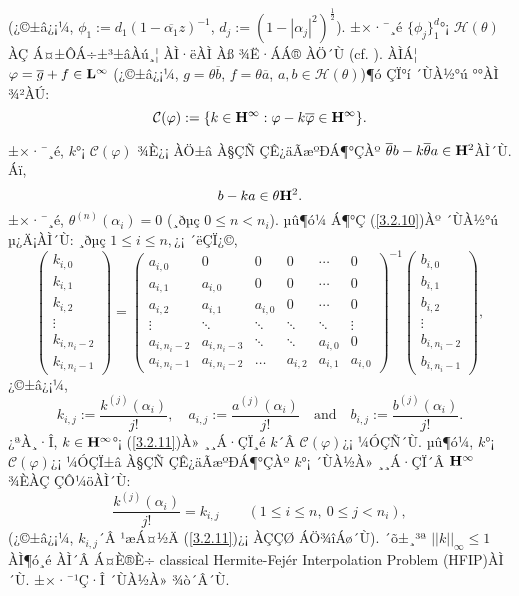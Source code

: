 \documentclass[12pt,a4paper,2sided]{article}
\begin{document}
\noindent (¿©±â¿¡¼­, $\phi_1 :=d_1(1- \overline{\alpha_1}z)^{-1}$,
$d_j:=(1-|\alpha_j |^2)^{\frac{1}{2}}$). ±×·¯¸é $\{\phi_j \}_1^d$°¡
$\mathcal H (\theta)$ÀÇ Á¤±ÔÁ÷±³±âÀú¸¦ ÀÌ·ëÀÌ Àß ¾Ë·ÁÁ® ÀÖ´Ù (cf.
\cite[Theorem X.1.5]{FF}). ÀÌÁ¦ $\varphi=\overline g+f\in \bold
L^\infty$ (¿©±â¿¡¼­, $g=\theta \overline b$, $f=\theta \overline a$,
$a, b\in \mathcal H (\theta)$)¶ó ÇÏ°í ´ÙÀ½°ú °°ÀÌ ¾²ÀÚ:
$$
\mathcal{C}(\varphi):= \{k \in \bold H^{\infty} : \varphi -k
\overline{\varphi} \in \bold H^{\infty}\}.
$$
\newpage{}

\vspace{.8 cm} \noindent ±×·¯¸é, $k$°¡ $\mathcal{C}(\varphi)$ ¾È¿¡
ÀÖ±â À§ÇÑ ÇÊ¿äÃæºÐÁ¶°ÇÀº $\overline {\theta} b-k \overline{\theta}a
\in \bold H^2$ÀÌ´Ù. Áï,
\begin{equation}\label{3.2.10}
b-ka \in \theta \bold H^2 .
\end{equation}
±×·¯¸é, $\theta^{(n)} (\alpha_i) =0$ (¸ðµç $0 \leq n  < n_i$).
µû¶ó¼­ Á¶°Ç (\ref{3.2.10})Àº ´ÙÀ½°ú µ¿Ä¡ÀÌ´Ù:
¸ðµç $1 \leq i \leq n,$¿¡ ´ëÇÏ¿©,
\begin{equation}\label{3.2.11}
\begin{pmatrix} k_{i,0}\\
k_{i,1}\\
k_{i,2}\\
\vdots\\
k_{i,n_i -2}\\
k_{i,n_i -1}
\end{pmatrix}
=\begin{pmatrix} a_{i,0}&0&0&0&\cdots&0\\
a_{i,1}&a_{i,0}&0&0&\cdots&0\\
a_{i,2}&a_{i,1}&a_{i,0}&0&\cdots&0\\
\vdots&\ddots&\ddots&\ddots&\ddots&\vdots \\
a_{i,n_i -2}&a_{i,n_i -3}&\ddots&\ddots&a_{i,0}&0\\
a_{i,n_i -1}&a_{i,n_i -2}&\hdots&a_{i,2}&a_{i,1}&a_{i,0}
\end{pmatrix}^{-1}
\begin{pmatrix} b_{i,0}\\
b_{i,1}\\
b_{i,2}\\
\vdots\\
b_{i,n_i -2}\\
b_{i,n_i -1}
\end{pmatrix},
\end{equation}
¿©±â¿¡¼­,
$$
k_{i,j}:= \frac{k^{(j)}(\alpha_i)}{j!},\quad a_{i,j}:=
\frac{a^{(j)}(\alpha_i)}{j!} \quad\text{and}\quad
b_{i,j}:=\frac{b^{(j)}(\alpha_i)}{j!}.
$$
¿ªÀ¸·Î, $k \in \bold H^{\infty}$°¡ (\ref{3.2.11})À» ¸¸Á·ÇÏ¸é $k$´Â
$\mathcal{C}(\varphi)$¿¡ ¼ÓÇÑ´Ù. µû¶ó¼­, $k$°¡
$\mathcal{C}(\varphi)$¿¡ ¼ÓÇÏ±â À§ÇÑ ÇÊ¿äÃæºÐÁ¶°ÇÀº  $k$°¡ ´ÙÀ½À»
¸¸Á·ÇÏ´Â $\bold H^{\infty}$ ¾ÈÀÇ ÇÔ¼öÀÌ´Ù:
\begin{equation}\label{3.2.12}
\frac{k^{(j)}(\alpha_i)}{j!} = k_{i,j} \qquad (1 \leq i \leq n, \
0 \leq j < n_i),
\end{equation}
(¿©±â¿¡¼­, $k_{i,j}$´Â ¹æÁ¤½Ä (\ref{3.2.11})¿¡ ÀÇÇØ ÁÖ¾îÁø´Ù).
´õ±¸³ª $||k||_\infty\le 1$\,ÀÌ¶ó¸é ÀÌ´Â Á¤È®È÷  classical
Hermite-Fej\' er Interpolation Problem (HFIP)ÀÌ´Ù. ±×·¯¹Ç·Î ´ÙÀ½À»
¾ò´Â´Ù.
\end{document}
